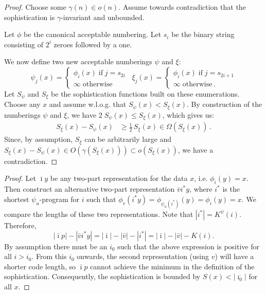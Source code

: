 \documentclass{style/llncs}
\newcommand{\s}{S}
\newcommand{\p}{\,\text{.}}
\begin{document}
\begin{proof}
Choose some $\gamma(n) \in o(n)$. Assume towards contradiction that the sophistication is $\gamma$-invariant and unbounded.

Let $\phi$ be the canonical acceptable numbering. Let $s_i$ be the binary string consisting of $2^{i}$ zeroes followed by a one.

We now define two new acceptable numberings $\psi$ and $\xi$:
\[
\psi_j(x) = \begin{cases}
	\phi_i(x) \;\text{if}\; j = s_{2i}\\
	\infty\;\text{otherwise}
\end{cases}\,\,\,
\xi_j(x) = 
\begin{cases}
	\phi_i(x) \;\text{if}\; j = s_{2i+1} \\
	\infty \;\text{otherwise}\p
\end{cases}
\]
Let $\s_\psi$ and $\s_\xi$ be the sophistication functions built on these enumerations. Choose any $x$ and assume w.l.o.g. that $\s_\psi(x) < \s_\xi(x)$. By construction of the numberings $\psi$ and $\xi$, we have $2\;\s_\psi(x)  \leq \s_\xi(x)$, which gives us:
\begin{align*}
	\s_\xi(x) - \s_\psi(x) &\geq \frac{1}{2}\, \s_\xi(x)  \in \Omega(\s_\xi(x))\p 
\end{align*}
Since, by assumption, $\s_\xi$ can be arbitrarily large and $\s_\xi(x) - \s_\psi(x) \in O(\gamma(\s_\xi(x))) \subset o(\s_\xi(x))$, we have a contradiction.
\end{proof}

\ineffprefix*
\begin{proof}
Let $\bar\imath y$ be any two-part representation for the data $x$, i.e. $\phi_i(y)=x$. Then construct an alternative two-part representation $\bar vi^* y$, where $i^*$ is the shortest $\psi_u$-program for $i$ such that $\phi_v(i^* y)=\phi_{\psi_u(i^*)}(y) = \phi_i(y)=x$. We compare the lengths of these two representations. Note that $|i^*|=K^\psi(i)$. Therefore,
\[
|\bar\imath p|-|\bar v i^* y| = |\bar\imath|-|\bar v| - |i^*| = |\bar\imath|-|\bar v|-K(i).
\]
By assumption there must be an $i_0$ such that the above expression is positive for all $i>i_0$. From this $i_0$ onwards, the second representation (using $v$) will have a shorter code length, so $\bar\imath p$ cannot achieve the minimum in the definition of the sophistication. Consequently, the sophistication is bounded by $\s(x)<|\overline{\imath_0}|$ for all $x$. 
\end{proof}
\end{document}
